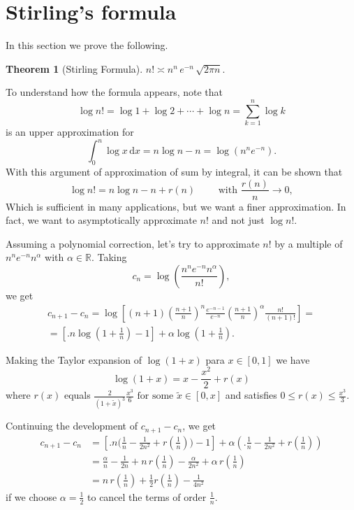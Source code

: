 \documentclass[12pt]{article}
\newtheorem{theorem}[equation]{Theorem}
\theoremstyle{definition}
\newcommand{\dd}{\mathrm{d}}
\newcommand{\R}{\mathbb{R}}
\renewcommand{\le}{\leqslant}
\begin{document}
\section*{Stirling's formula}

In this section we prove the following.
\begin{theorem}
[Stirling Formula]
\(
n! \asymp n^n \, e^{-n} \, \sqrt{2\pi n}.
\)
\end{theorem}

To understand how the formula appears, note that
\[
\log n! = \log 1 + \log 2 + \cdots + \log n = \sum_{k=1}^n \log k
\]
is an upper approximation for
\[
\int_{0}^{n} \log x \, \dd x = n \log n - n = \log( n^n e^{-n} )
.
\]
With this argument of approximation of sum by integral, it can be shown that
\[
\log n! = n \log n - n + r(n)
\qquad
\text{ with }
\frac{r(n)}{n}\to 0
,
\]
Which is sufficient in many applications, but we want a finer approximation.
In fact, we want to asymptotically approximate $n!$ and not just $\log n!$.

Assuming a polynomial correction, let's try to approximate $ n! $ by a multiple of
\(
n^n e^{-n} n^\alpha
\)
with $\alpha\in\R$.
Taking
\[
c_n = \log \left( \frac{n^n e^{-n} n^\alpha}{n!} \right)
,
\]
we get
\begin{multline*}
c_{n+1}-c_n
=
\log \left[ \textstyle (n+1) \left( \frac{n+1}{n} \right)^n \frac{e^{-n-1}}{e^{-n}} \left( \frac{n+1}{n} \right)^\alpha \frac{n!}{(n+1)!} \right]
=
\\
=
\left[ \big. n \log (1+\tfrac{1}{n}) - 1 \right] + \alpha \log(1+\tfrac{1}{n})
.
\end{multline*}

Making the Taylor expansion of $\log(1+x)$ para $x\in[0,1]$ we have
\[
\log(1+x) = x - \frac{x^2}{2} + r(x)
\]
where $r(x)$ equals
\(
\frac{2}{(1+\tilde{x})^{3}} \frac{x^3}{6}
\text{ for some }
\tilde{x} \in [0,x]
\)
and satisfies
\(
0 \le r(x) \le \frac{x^3}{3}
.
\)

Continuing the development of $c_{n+1}-c_n$, we get
\begin{align*}
c_{n+1} - c_n
&=
\left[ \big. n \big( \tfrac{1}{n} - \tfrac{1}{2n^2} + r(\tfrac{1}{n}) \big) - 1 \right]
+
\alpha \left( \big. \tfrac{1}{n} - \tfrac{1}{2n^2} + r(\tfrac{1}{n}) \right)
\\
&=
\tfrac{\alpha}{n} - \tfrac{1}{2n} + n \, r(\tfrac{1}{n}) - \tfrac{\alpha}{2n^2} + \alpha \, r(\tfrac{1}{n})
\\
&=
n \, r(\tfrac{1}{n}) + \tfrac{1}{2} r(\tfrac{1}{n}) - \tfrac{1}{4n^2}
\end{align*}
if we choose $\alpha=\frac{1}{2}$ to cancel the terms of order $\frac{1}{n}$.
\end{document}

